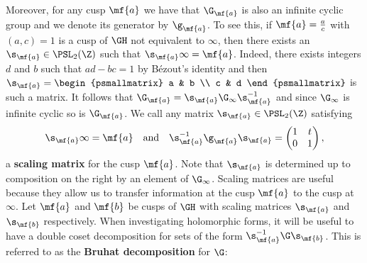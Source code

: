       Moreover, for any cusp $\mf{a}$ we have that $\G_{\mf{a}}$ is also an infinite cyclic group and we denote its generator by $\g_{\mf{a}}$. To see this, if $\mf{a} = \frac{a}{c}$ with $(a,c) = 1$ is a cusp of $\GH$ not equivalent to $\infty$, then there exists an $\s_{\mf{a}} \in \PSL_{2}(\Z)$ such that $\s_{\mf{a}}\infty = \mf{a}$. Indeed, there exists integers $d$ and $b$ such that $ad-bc = 1$ by B\'ezout's identity and then $\s_{\mf{a}} = \begin{psmallmatrix} a & b \\ c & d \end{psmallmatrix}$ is such a matrix. It follows that $\G_{\mf{a}} = \s_{\mf{a}}\G_{\infty}\s_{\mf{a}}^{-1}$ and since $\G_{\infty}$ is infinite cyclic so is $\G_{\mf{a}}$. We call any matrix $\s_{\mf{a}} \in \PSL_{2}(\Z)$ satisfying 
      \[
        \s_{\mf{a}}\infty = \mf{a} \quad \text{and} \quad \s_{\mf{a}}^{-1}\g_{\mf{a}}\s_{\mf{a}} = \begin{pmatrix} 1 & t \\ 0 & 1 \end{pmatrix},
      \]
      a \textbf{scaling matrix} for the cusp $\mf{a}$. Note that $\s_{\mf{a}}$ is determined up to composition on the right by an element of $\G_{\infty}$. Scaling matrices are useful because they allow us to transfer information at the cusp $\mf{a}$ to the cusp at $\infty$. Let $\mf{a}$ and $\mf{b}$ be cusps of $\GH$ with scaling matrices $\s_{\mf{a}}$ and $\s_{\mf{b}}$ respectively. When investigating holomorphic forms, it will be useful to have a double coset decomposition for sets of the form $\s_{\mf{a}}^{-1}\G\s_{\mf{b}}$. This is referred to as the \textbf{Bruhat decomposition} for $\G$:


